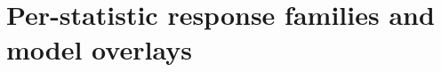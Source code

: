 \documentclass[linenumbers,trackchanges, twocolumn]{aastex701}
\begin{document}
\section{Per-statistic response families and model overlays}\label{app:figs}

{}



\end{document}
